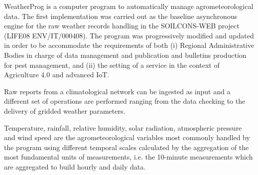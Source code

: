\documentclass[authoryear,preprint,review,12pt]{elsarticle}
\begin{document}
WeatherProg \citep{langella:weatherprog2014} is a computer program to automatically manage agrometeorological data.
The first implementation was carried out as the baseline asynchronous engine for the raw weather records handling in the SOILCONS-WEB project (LIFE08 ENV/IT/000408).
The program was progressively modified and updated in order to be accommodate the requirements of both (i) Regional Administrative Bodies in charge of data management and publication and bulletins production for pest management, and (ii) the setting of a service in the context of Agriculture 4.0 and advanced IoT.

Raw reports from a climatological network can be ingested as input and a different set of operations are performed ranging from the data checking to the delivery of gridded weather parameters.

Temperature, rainfall, relative humidity, solar radiation, atmospheric pressure and wind speed are the agrometeorological variables most commonly handled by the program using different temporal scales calculated by the aggregation of the most fundamental units of measurements, i.e. the 10-minute  measurements which are aggregated to build hourly and daily data.
\end{document}
